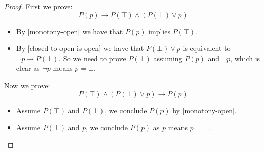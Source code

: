 \begin{proof}
First we prove:
\[P(p) \to P(\top)\land(P(\bot)\lor p)\]
\begin{itemize}
\item By \cref{monotony-open} we have that $P(p)$ implies $P(\top)$.
\item By \cref{closed-to-open-is-open} we have that $P(\bot)\lor p$ is equivalent to $\neg p \to P(\bot)$. So we need to prove $P(\bot)$ assuming $P(p)$ and $\neg p$, which is clear as $\neg p$ means $p=\bot$. 
\end{itemize}
Now we prove:
\[P(\top)\land(P(\bot)\lor p) \to P(p)\]
\begin{itemize}
\item Assume $P(\top)$ and $P(\bot)$, we conclude $P(p)$ by \cref{monotony-open}.
\item Assume $P(\top)$ and $p$, we conclude $P(p)$ as $p$ means $p=\top$.
\end{itemize}
\end{proof}